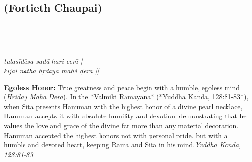 
\newpage

\subsection*{ (Fortieth Chaupai)}

\begin{minipage}[t]{0.55\textwidth}
\vspace{0pt}

{\large \linespread{1.5}\selectfont
{}\\
\par}

\vspace{0.5em}

{\large \linespread{1.5}\selectfont
{}\\
\par}

\vspace{0.5em}

{\large \linespread{1.3}\selectfont
\textit{tulasīdāsa sadā hari cerā |}\\
\textit{kījai nātha hṛdaya mahã ḍerā ||}
\par}
\end{minipage}%
\hfill
\begin{minipage}[t]{0.42\textwidth}
\vspace{0pt}
\begin{tcolorbox}[anchorbox]
\textbf{Egoless Honor:} True greatness and peace begin with a humble, egoless mind (\textit{Hriday Maha Dera}). In the *Valmiki Ramayana* (*Yuddha Kanda, 128:81-83*), when Sita presents Hanuman with the highest honor of a divine pearl necklace, Hanuman accepts it with absolute humility and devotion, demonstrating that he values the love and grace of the divine far more than any material decoration.
\vspace{0.5em}\newline Hanuman accepted the highest honors not with personal pride, but with a humble and devoted heart, keeping Rama and Sita in his mind.\newline\null\hfill\href{https://www.valmiki.iitk.ac.in/sloka?field_kanda_tid=6&language=dv&field_sarga_value=128}{\textit{Yuddha Kanda, 128:81-83}}
\end{tcolorbox}
\end{minipage}

